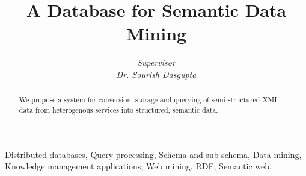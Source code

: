 \documentclass[conference]{IEEEtran}
\begin{document}
%
\title{A Database for Semantic Data Mining}
%
%
\author{
\emph{Supervisor}\\\emph{Dr. Sourish Dasgupta}
}%
%




\maketitle


\begin{abstract}
    We propose a system for conversion, storage and querying of semi-structured XML data from heterogenous services into structured, semantic data.
\end{abstract}

\begin{IEEEkeywords}
    Distributed databases, Query processing, Schema and sub-schema, Data mining, Knowledge management applications, Web mining, RDF, Semantic web.
\end{IEEEkeywords}
\end{document}
